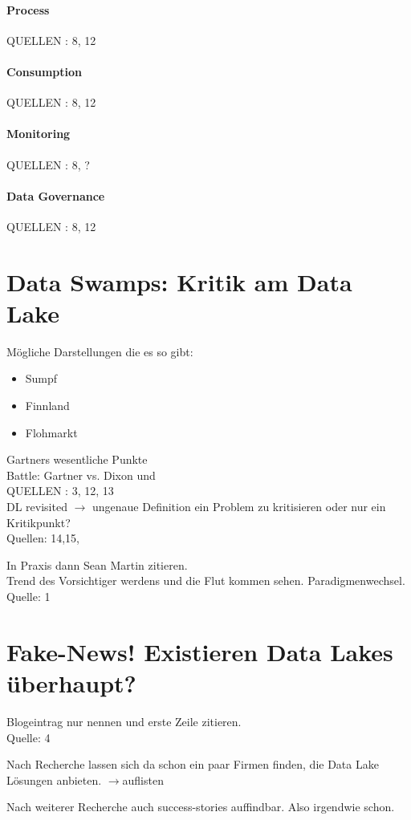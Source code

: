 \documentclass[twoside,twocolumn]{article}
\begin{document}
\paragraph{Process}
QUELLEN : 8, 12
\paragraph{Consumption}
QUELLEN : 8, 12
\paragraph{Monitoring}
QUELLEN : 8, ?
\paragraph{Data Governance}
QUELLEN : 8, 12


\section{Data Swamps: Kritik am Data Lake}
Mögliche Darstellungen die es so gibt:
\begin{itemize}
	\item Sumpf
	\item Finnland
	\item Flohmarkt
\end{itemize}

Gartners wesentliche Punkte\\

Battle: Gartner vs. Dixon und \\
QUELLEN : 3, 12, 13\\
DL revisited $\rightarrow$ ungenaue Definition ein Problem zu kritisieren oder nur ein Kritikpunkt?\\
Quellen: 14,15,

In Praxis dann Sean Martin zitieren.\\
Trend des Vorsichtiger werdens und die Flut kommen sehen. Paradigmenwechsel.
Quelle: 1

\section{Fake-News! Existieren Data Lakes überhaupt?}
Blogeintrag nur nennen und erste Zeile zitieren.\\
Quelle: 4

Nach Recherche lassen sich da schon ein paar Firmen finden, die Data Lake Lösungen anbieten.
$\rightarrow$auflisten


Nach weiterer Recherche auch success-stories auffindbar. Also irgendwie schon.
\end{document}
